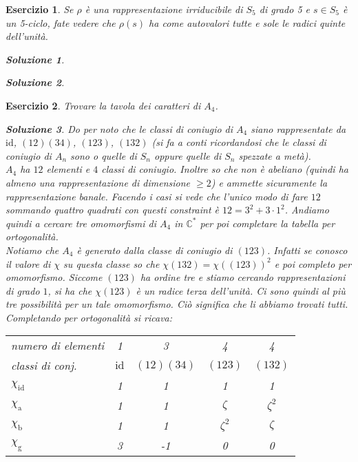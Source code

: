\documentclass[a4paper]{article}
\theoremstyle{break}
\newtheorem{ex}{{ \Large Esercizio} }
\theoremstyle{plain}
\newtheorem{sol}{Soluzione}[ex]
\begin{document}
\begin{ex}
Se $\rho$ è una rappresentazione irriducibile di $S_5$ di grado 5 e $s \in S_5$ è un 5-ciclo, fate vedere che $\rho(s)$ ha come autovalori tutte e sole le radici quinte dell’unità.

\begin{sol}

\end{sol}

\begin{sol}

\end{sol}


\end{ex}

\begin{ex}
Trovare la tavola dei caratteri di $A_4$.

\begin{sol}
	Do per noto che le classi di coniugio di $A_4$ siano rappresentate da $\text{id}$, $(1 2)(3 4)$, $(1 2 3)$, $(1 3 2)$ (si fa a conti ricordandosi che le classi di coniugio di $A_n$ sono o quelle di $S_n$ oppure quelle di $S_n$ spezzate a metà). \\
	$A_4$ ha $12$ elementi e $4$ classi di coniugio. Inoltre so che non è abeliano (quindi ha almeno una rappresentazione di dimensione $\ge 2$) e ammette sicuramente la rappresentazione banale. Facendo i casi si vede che l'unico modo di fare $12$ sommando quattro quadrati con questi constraint è $12 = 3^2 + 3 \cdot 1^2$. Andiamo quindi a cercare tre omomorfismi di $A_4$ in $\mathbb{C}^{*}$ per poi completare la tabella per ortogonalità. \\
	Notiamo che $A_4$ è generato dalla classe di coniugio di $(1 2 3)$. Infatti se conosco il valore di $\chi$ su questa classe so che $\chi (1 3 2) = \chi((1 2 3)) ^2$ e poi completo per omomorfismo. Siccome $(1 2 3)$ ha ordine tre e stiamo cercando rappresentazioni di grado $1$, si ha che $\chi (1 2 3)$ è un radice terza dell'unità. Ci sono quindi al più tre possibilità per un tale omomorfismo. Ciò significa che li abbiamo trovati tutti. \\
	Completando per ortogonalità si ricava:
	\begin{center} \begin{tabular}{lcccc}
	numero di elementi & 1   & 3   & 4   & 4   \\
	classi di conj. & $\text{id}$ & $(1 2)(3 4)$ & $(1 2 3)$ & $(1 3 2)$ \\ \hline
	$\chi_\text{id}$ & 1    & 1    & 1    & 1    \\
	$\chi_\text{a}$  & 1    & 1    & $\zeta$ & $\zeta^2$ \\
	$\chi_\text{b}$  & 1    & 1    & $\zeta^2$ & $\zeta$ \\
	$\chi_\text{g}$  & 3    & -1   & 0    & 0    \\
	\end{tabular} \end{center} \vskip 0.5cm
\end{sol}


\end{ex}
\end{document}
